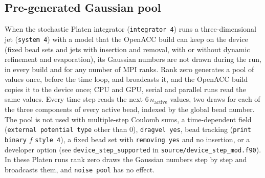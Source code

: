 \subsection{Pre-generated Gaussian pool\label{sec:Noise-pool}}

When the stochastic Platen integrator (\texttt{integrator 4}) runs a
three-dimensional jet (\texttt{system 4}) with a model that the OpenACC
build can keep on the device (fixed bead sets and jets with insertion and
removal, with or without dynamic refinement and evaporation), its
Gaussian numbers are not drawn during the run, in every build and for any
number of MPI ranks. Rank zero generates a pool of values once, before the
time loop, and broadcasts it, and the OpenACC build copies it to the device
once; CPU and GPU, serial and parallel runs read the same values. Every time
step reads the next $6\,n_{\mathrm{active}}$ values, two draws for each of
the three components of every active bead, indexed by the global bead
number. The pool is not used with multiple-step Coulomb sums, a
time-dependent field (\texttt{external potential type} other than 0),
\texttt{dragvel yes}, bead tracking (\texttt{print binary} $f$
\texttt{style 4}), a fixed bead set with \texttt{removing yes} and no
insertion, or a developer option (see \texttt{device\_step\_supported} in
\texttt{source/device\_step\_mod.f90}). In these Platen runs rank zero draws
the Gaussian numbers step by step and broadcasts them, and
\texttt{noise pool} has no effect.

